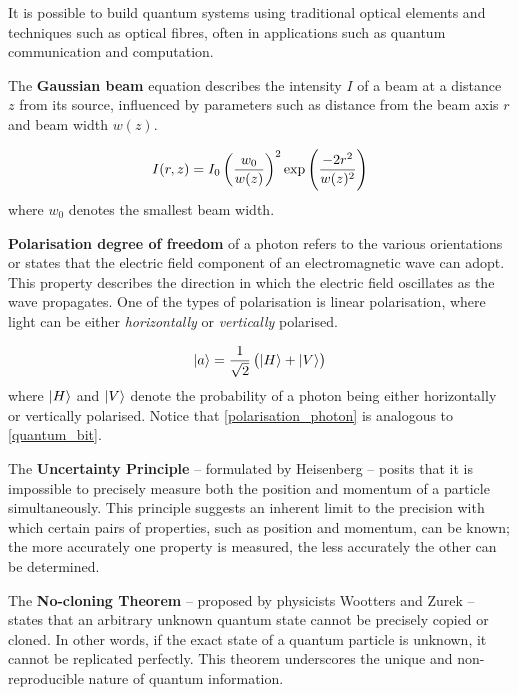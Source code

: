 \documentclass[12pt,a4paper]{article}
\begin{document}
It is possible to build quantum systems using traditional optical elements and techniques such as optical fibres, often in applications such as quantum communication and computation.

The \textbf{Gaussian beam} equation describes the intensity $I$ of a beam at a distance $z$ from its source, influenced by parameters such as distance from the beam axis $r$ and beam width $w(z)$.

\begin{equation}
I(r,z) = I_0\left(\frac{w_0}{w(z)}\right)^2\exp\left(\frac{-2r^2}{w(z)^2}\right)
\end{equation}
where $w_0$ denotes the smallest beam width.

\textbf{Polarisation degree of freedom} of a photon refers to the various orientations or states that the electric field component of an electromagnetic wave can adopt. This property describes the direction in which the electric field oscillates as the wave propagates. One of the types of polarisation is linear polarisation, where light can be either \textit{horizontally} or \textit{vertically} polarised.

\begin{equation}\label{polarisation_photon}
\ket{a} = \frac{1}{\sqrt{2}}\left(\ket{H}+\ket{V}\right)
\end{equation}
where $\ket{H}$ and $\ket{V}$ denote the probability of a photon being either horizontally or vertically polarised. Notice that \cref{polarisation_photon} is analogous to \cref{quantum_bit}.


The \textbf{Uncertainty Principle} -- formulated by Heisenberg -- posits that it is impossible to precisely measure both the position and momentum of a particle simultaneously. This principle suggests an inherent limit to the precision with which certain pairs of properties, such as position and momentum, can be known; the more accurately one property is measured, the less accurately the other can be determined.

The \textbf{No-cloning Theorem} -- proposed by physicists Wootters and Zurek -- states that an arbitrary unknown quantum state cannot be precisely copied or cloned. In other words, if the exact state of a quantum particle is unknown, it cannot be replicated perfectly. This theorem underscores the unique and non-reproducible nature of quantum information.
\end{document}
